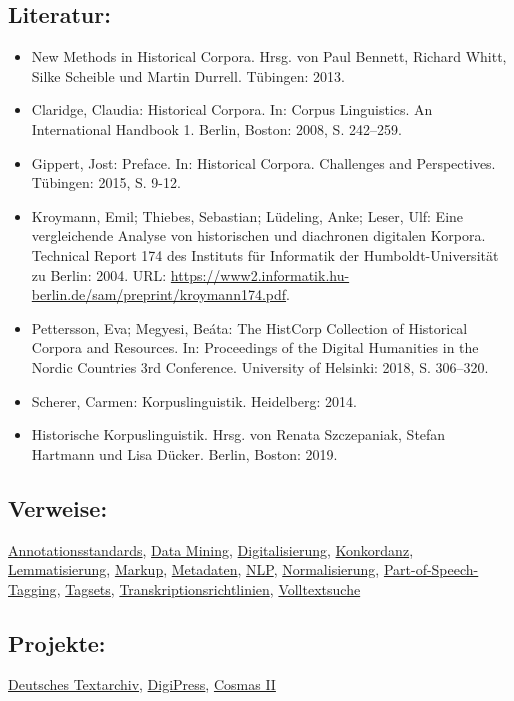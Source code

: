 \documentclass{article}
\begin{document}
        \subsection*{Literatur:}\begin{itemize}\item New Methods in Historical Corpora. Hrsg. von Paul Bennett, Richard Whitt, Silke Scheible und Martin Durrell. Tübingen: 2013.\item Claridge, Claudia: Historical Corpora. In: Corpus Linguistics. An International Handbook 1. Berlin, Boston: 2008, S. 242–259.\item Gippert, Jost: Preface. In: Historical Corpora. Challenges and Perspectives. Tübingen: 2015, S. 9-12.\item Kroymann, Emil; Thiebes, Sebastian; Lüdeling, Anke; Leser, Ulf: Eine vergleichende Analyse von historischen und diachronen digitalen Korpora. Technical Report 174 des Instituts für Informatik der Humboldt-Universität zu Berlin: 2004. URL: \url{https://www2.informatik.hu-berlin.de/sam/preprint/kroymann174.pdf}.\item Pettersson, Eva; Megyesi, Beáta: The HistCorp Collection of Historical Corpora and Resources. In: Proceedings of the Digital Humanities in the Nordic Countries 3rd Conference. University of Helsinki: 2018, S. 306–320.\item Scherer, Carmen: Korpuslinguistik. Heidelberg: 2014.\item Historische Korpuslinguistik. Hrsg. von Renata Szczepaniak, Stefan Hartmann und Lisa Dücker. Berlin, Boston: 2019.\end{itemize}\subsection*{Verweise:}\href{https://gams.uni-graz.at/o:konde.29}{Annotationsstandards}, \href{https://gams.uni-graz.at/o:konde.48}{Data Mining}, \href{https://gams.uni-graz.at/o:konde.60}{Digitalisierung}, \href{https://gams.uni-graz.at/o:konde.106}{Konkordanz}, \href{https://gams.uni-graz.at/o:konde.115}{Lemmatisierung}, \href{https://gams.uni-graz.at/o:konde.126}{Markup}, \href{https://gams.uni-graz.at/o:konde.25}{Metadaten}, \href{https://gams.uni-graz.at/o:konde.145}{NLP}, \href{https://gams.uni-graz.at/o:konde.146}{Normalisierung}, \href{https://gams.uni-graz.at/o:konde.156}{Part-of-Speech-Tagging}, \href{https://gams.uni-graz.at/o:konde.177}{Tagsets}, \href{https://gams.uni-graz.at/o:konde.198}{Transkriptionsrichtlinien}, \href{https://gams.uni-graz.at/o:konde.211}{Volltextsuche}\subsection*{Projekte:}\href{http://www.deutschestextarchiv.de/}{Deutsches Textarchiv}, \href{https://digipress.digitale-sammlungen.de/}{DigiPress}, \href{https://www.ids-mannheim.de/cosmas2/}{Cosmas II
}
\end{document}
